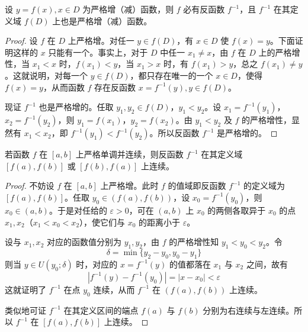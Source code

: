 \documentclass[../../main.tex]{subfiles}
\begin{document}
\begin{theorem}[反函数存在定理]\label{theorem:反函数存在定理}
设 \( y = f(x), x \in D \) 为严格增（减）函数，则 \( f \) 必有反函数 \( f^{-1} \)，且 \( f^{-1} \) 在其定义域 \( f(D) \) 上也是严格增（减）函数。
\end{theorem}
\begin{proof}
设 \( f \) 在 \( D \) 上严格增。对任一 \( y \in f(D) \)，有 \( x \in D \) 使 \( f(x) = y \)。下面证明这样的 \( x \) 只能有一个。事实上，对于 \( D \) 中任一 \( x_1 \neq x \)，由 \( f \) 在 \( D \) 上的严格增性，当 \( x_1 < x \) 时，\( f(x_1) < y \)，当 \( x_1 > x \) 时，有 \( f(x_1) > y \)，总之 \( f(x_1) \neq y \)。这就说明，对每一个 \( y \in f(D) \)，都只存在唯一的一个 \( x \in D \)，使得 \( f(x) = y \)，从而函数 \( f \) 存在反函数 \( x = f^{-1}(y), y \in f(D) \)。

现证 \( f^{-1} \) 也是严格增的。任取 \( y_1, y_2 \in f(D) \)，\( y_1 < y_2 \)。设 \( x_1 = f^{-1}(y_1) \)，\( x_2 = f^{-1}(y_2) \)，则 \( y_1 = f(x_1) \)，\( y_2 = f(x_2) \)。由 \( y_1 < y_2 \) 及 \( f \) 的严格增性，显然有 \( x_1 < x_2 \)，即 \( f^{-1}(y_1) < f^{-1}(y_2) \)。所以反函数 \( f^{-1} \) 是严格增的。

\end{proof}

\begin{theorem}[反函数连续定理]\label{theorem:反函数连续定理}
若函数 \( f \) 在 \([a, b]\) 上严格单调并连续，则反函数 \( f^{-1} \) 在其定义域 \([f(a), f(b)]\) 或 \([f(b), f(a)]\) 上连续。
\end{theorem}
\begin{proof}
不妨设 \( f \) 在 \([a, b]\) 上严格增。此时 \( f \) 的值域即反函数 \( f^{-1} \) 的定义域为 \([f(a), f(b)]\)。任取 \( y_0 \in (f(a), f(b)) \)，设 \( x_0 = f^{-1}(y_0) \)，则 \( x_0 \in (a, b) \)。于是对任给的 \( \varepsilon > 0 \)，可在 \( (a, b) \) 上 \( x_0 \) 的两侧各取异于 \( x_0 \) 的点 \( x_1, x_2 \)（\( x_1 < x_0 < x_2 \)），使它们与 \( x_0 \) 的距离小于 \( \varepsilon \)。

设与 \( x_1, x_2 \) 对应的函数值分别为 \( y_1, y_2 \)，由 \( f \) 的严格增性知 \( y_1 < y_0 < y_2 \)。令
\[
\delta = \min\{ y_2 - y_0, y_0 - y_1 \}
\]
则当 \( y \in U(y_0; \delta) \) 时，对应的 \( x = f^{-1}(y) \) 的值都落在 \( x_1 \) 与 \( x_2 \) 之间，故有
\[
| f^{-1}(y) - f^{-1}(y_0) | = | x - x_0 | < \varepsilon
\]
这就证明了 \( f^{-1} \) 在点 \( y_0 \) 连续，从而 \( f^{-1} \) 在 \( (f(a), f(b)) \) 上连续。

类似地可证 \( f^{-1} \) 在其定义区间的端点 \( f(a) \) 与 \( f(b) \) 分别为右连续与左连续。所以 \( f^{-1} \) 在 \([f(a), f(b)]\) 上连续。

\end{proof}
\end{document}
